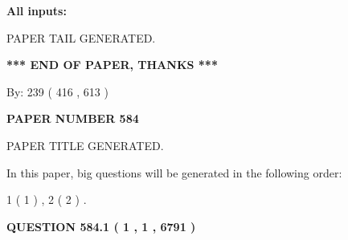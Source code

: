 \documentclass[12pt]{article}
\begin{document}
   
   
   
\noindent{}
   
   
   
   
\noindent\vspace{0.1in}\hspace{-0.08in} {\textbf{\Large{All inputs: }}}
   
   
   
   
   
   
 \vspace{0.2in}
 
   
   
\vspace{2.0in} PAPER TAIL GENERATED.
   
   
   
   
\vspace{1.0in} 
{\textbf{\large{ *** END OF PAPER, THANKS *** }}} 
   
   
\hspace{1.0in} By: 
 239 ( 416 ,  613 )
   
   
   
   
\newpage 
\setcounter{page}{ 
   584001 } 
   
   
   
   
 {\textbf{ \Large{ PAPER NUMBER  584  }}}
   
   
\vspace{0.2in}
   
   
   
   
   
   
   
   
 \vspace{0.2in}
 
 
 
 
   
   
 PAPER TITLE GENERATED.
   
   
   
\vspace{0.2in}
   
In this paper, big questions will be generated in the following order: 
   
   
   1 ( 1 )
 ,
   2 ( 2 )
 .
  
\vspace{0.2in}
  
{\textbf{\Large{QUESTION
584.1 
 ( 1 , 1 , 6791 )
}}}
  
\end{document}
